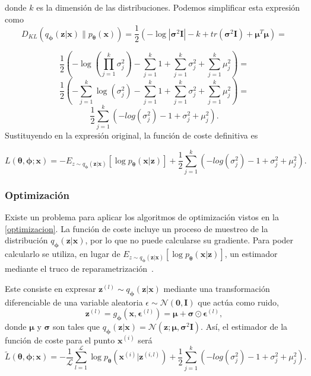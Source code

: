 donde $k$ es la dimensión de las distribuciones. Podemos simplificar esta expresión como $$D_{KL}(q_{\boldsymbol{\phi}}(\textbf{z}|\textbf{x}) \parallel p_{\boldsymbol{\theta}}(\textbf{x})) =  \frac{1}{2} \left( -\log|\boldsymbol{\sigma}^{2}\textbf{I}| -k + tr(\boldsymbol{\sigma}^{2}\textbf{I}) + \boldsymbol{\mu}^T\boldsymbol{\mu} \right) = $$

$$\frac{1}{2} \left( -\log (\prod_{j=1}^{k}\sigma_j^{2}) -\sum_{j=1}^k 1 + \sum_{j=1}^k \sigma_j^2 + \sum_{j=1}^k \mu_j^2 \right) =$$ $$\frac{1}{2} \left( -\sum_{j=1}^k\log (\sigma_j^{2}) -\sum_{j=1}^k 1 + \sum_{j=1}^k \sigma_j^2 + \sum_{j=1}^k \mu_j^2 \right) = $$ $$ \frac{1}{2}\sum_{j=1}^k \left( -log(\sigma_j^2) -1 + \sigma_j^2 + \mu_j^2 \right).$$ Sustituyendo en la expresión original, la función de coste definitiva es

$$L(\boldsymbol{\theta}, \boldsymbol{\phi}; \textbf{x}) = - E_{z \sim q_{\boldsymbol{\phi}} (\textbf{z}|\textbf{x})} \left[ \log p_{\boldsymbol{\theta}}(\textbf{x}|\textbf{z}) \right] +  \frac{1}{2}\sum_{j=1}^k \left( -log(\sigma_j^2) -1 + \sigma_j^2 + \mu_j^2 \right). $$

\subsubsection{Optimización}

Existe un problema para aplicar los algoritmos de optimización vistos en la \autoref{optimizacion}. La función de coste incluye un proceso de muestreo de la distribución $q_{\boldsymbol{\phi}} (\textbf{z}|\textbf{x})$, por lo que no puede calcularse su gradiente. Para poder calcularlo se utiliza, en lugar de $E_{z \sim q_{\boldsymbol{\phi}} (\textbf{z}|\textbf{x})} \left[ \log p_{\boldsymbol{\theta}}(\textbf{x}|\textbf{z}) \right]$, un estimador mediante el truco de reparametrización~\cite{kingma2013auto}.

Este consiste en expresar $\textbf{z}^{(l)} \sim q_{\boldsymbol{\phi}} (\textbf{z}|\textbf{x})$ mediante una transformación diferenciable de una variable aleatoria $\epsilon \sim \mathcal{N}(\boldsymbol{0}, \textbf{I})$ que actúa como ruido, $$ \textbf{z}^{(l)} = g_{\boldsymbol{\phi}}(\textbf{x}, \boldsymbol{\epsilon}^{(l)}) = \boldsymbol{\mu} + \boldsymbol{\sigma} \odot \boldsymbol{\epsilon}^{(l)},$$ donde $\boldsymbol{\mu}$ y $\boldsymbol{\sigma}$ son tales que $q_{\boldsymbol{\phi}}(\textbf{z}|\textbf{x}) = \mathcal{N}(\textbf{z};\boldsymbol{\mu},\boldsymbol{\sigma}^{2}\textbf{I})$. Así, el estimador de la función de coste para el punto $\textbf{x}^{(i)}$ será $$\tilde{L}(\boldsymbol{\theta}, \boldsymbol{\phi}; \textbf{x}) = -\frac{1}{\mathcal{L}}\sum_{l=1}^{\mathcal{L}}\log p_{\boldsymbol{\theta}}(\textbf{x}^{(i)}|\textbf{z}^{(i,l)}) +  \frac{1}{2}\sum_{j=1}^k \left( -log(\sigma_j^2) -1 + \sigma_j^2 + \mu_j^2 \right).$$


